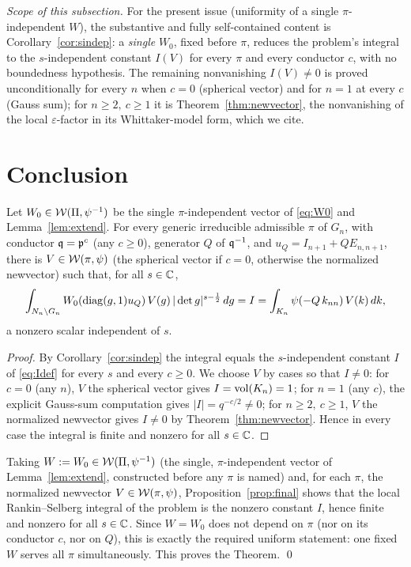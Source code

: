 \medskip
\noindent\emph{Scope of this subsection.} For the present issue \textup{(}uniformity of a single
$\pi$-independent $W$\textup{)}, the substantive and fully self-contained content is
Corollary~\ref{cor:sindep}: a \emph{single} $W_0$, fixed before $\pi$, reduces the problem's
integral to the $s$-independent constant $I(V)$ for every $\pi$ and every conductor $c$, with no
boundedness hypothesis. The remaining nonvanishing $I(V)\neq0$ is proved unconditionally for every
$n$ when $c=0$ \textup{(}spherical vector\textup{)} and for $n=1$ at every $c$ \textup{(}Gauss
sum\textup{)}; for $n\ge2,\ c\ge1$ it is Theorem~\ref{thm:newvector}, the nonvanishing of the local
$\varepsilon$-factor in its Whittaker-model form, which we cite.

\section*{Conclusion}

\begin{qtwoproposition}\label{prop:final}
Let $W_0\in\mathcal{W}(\Pi,\psi^{-1})$ be the single $\pi$-independent vector of \eqref{eq:W0} and
Lemma~\ref{lem:extend}. For every generic irreducible admissible $\pi$ of $G_n$, with conductor
$\mathfrak{q}=\mathfrak{p}^{c}$ \textup{(}any $c\ge0$\textup{)}, generator $Q$ of $\mathfrak{q}^{-1}$, and
$u_Q=I_{n+1}+QE_{n,n+1}$, there is $V\in\mathcal{W}(\pi,\psi)$ \textup{(}the spherical vector if $c=0$,
otherwise the normalized newvector\textup{)} such that, for all $s\in\mathbb{C}$,
\[
\int_{N_n\backslash G_n} W_0(\operatorname{diag}(g,1)u_Q)\,V(g)\,|\det g|^{s-\frac12}\,dg
= I=\int_{K_n}\psi(-Q\,k_{nn})\,V(k)\,dk,
\]
a nonzero scalar independent of $s$.
\end{qtwoproposition}

\begin{proof}
By Corollary~\ref{cor:sindep} the integral equals the $s$-independent constant $I$ of
\eqref{eq:Idef} for every $s$ and every $c\ge0$. We choose $V$ by cases so that $I\ne0$: for
$c=0$ \textup{(}any $n$\textup{)}, $V$ the spherical vector gives $I=\operatorname{vol}(K_n)=1$; for $n=1$
\textup{(}any $c$\textup{)}, the explicit Gauss-sum computation gives $|I|=q^{-c/2}\ne0$; for
$n\ge2,\ c\ge1$, $V$ the normalized newvector gives $I\ne0$ by
Theorem~\ref{thm:newvector}. Hence in every case the integral is finite and nonzero for all
$s\in\mathbb{C}$.
\end{proof}

Taking $W:=W_0\in\mathcal{W}(\Pi,\psi^{-1})$ \textup{(}the single, $\pi$-independent vector of
Lemma~\ref{lem:extend}, constructed before any $\pi$ is named\textup{)} and, for each $\pi$, the
normalized newvector $V\in\mathcal{W}(\pi,\psi)$, Proposition~\ref{prop:final} shows that the local
Rankin--Selberg integral of the problem is the nonzero constant $I$, hence finite and nonzero for
all $s\in\mathbb{C}$. Since $W=W_0$ does not depend on $\pi$ \textup{(}nor on its conductor $c$, nor on
$Q$\textup{)}, this is exactly the required uniform statement: one fixed $W$ serves all $\pi$
simultaneously. This proves the Theorem. \qed

